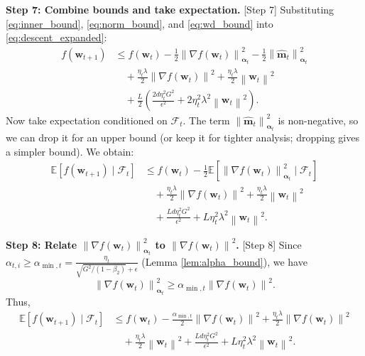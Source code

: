 \documentclass{article}
\theoremstyle{plain}
\theoremstyle{definition}
\renewcommand{\vec}[1]{\boldsymbol{#1}}
\newcommand{\norm}[1]{\left\| #1 \right\|}
\newcommand{\expect}[1]{\mathbb{E}\left[ #1 \right]}
\begin{document}
\textbf{Step 7: Combine bounds and take expectation.} [Step 7]
Substituting \eqref{eq:inner_bound}, \eqref{eq:norm_bound}, and \eqref{eq:wd_bound} into \eqref{eq:descent_expanded}:
\begin{align}
    f(\vec{w}_{t+1}) &\le f(\vec{w}_t) - \frac{1}{2} \norm{\nabla f(\vec{w}_t)}_{\vec{\alpha}_t}^2 - \frac{1}{2} \norm{\hat{\vec{m}}_t}_{\vec{\alpha}_t}^2 \\
    &\quad + \frac{\eta_t \lambda}{2} \norm{\nabla f(\vec{w}_t)}^2 + \frac{\eta_t \lambda}{2} \norm{\vec{w}_t}^2 \\
    &\quad + \frac{L}{2} \left( \frac{2 d \eta_t^2 G^2}{\epsilon^2} + 2 \eta_t^2 \lambda^2 \norm{\vec{w}_t}^2 \right).
\end{align}
Now take expectation conditioned on $\mathcal{F}_t$. The term $\norm{\hat{\vec{m}}_t}_{\vec{\alpha}_t}^2$ is non-negative, so we can drop it for an upper bound (or keep it for tighter analysis; dropping gives a simpler bound). We obtain:
\begin{align}
    \expect{f(\vec{w}_{t+1}) \mid \mathcal{F}_t} &\le f(\vec{w}_t) - \frac{1}{2} \expect{\norm{\nabla f(\vec{w}_t)}_{\vec{\alpha}_t}^2 \mid \mathcal{F}_t} \\
    &\quad + \frac{\eta_t \lambda}{2} \norm{\nabla f(\vec{w}_t)}^2 + \frac{\eta_t \lambda}{2} \norm{\vec{w}_t}^2 \\
    &\quad + \frac{L d \eta_t^2 G^2}{\epsilon^2} + L \eta_t^2 \lambda^2 \norm{\vec{w}_t}^2.
\end{align}

\textbf{Step 8: Relate $\norm{\nabla f(\vec{w}_t)}_{\vec{\alpha}_t}^2$ to $\norm{\nabla f(\vec{w}_t)}^2$.} [Step 8]
Since $\alpha_{t,i} \ge \alpha_{\min,t} = \frac{\eta_t}{\sqrt{G^2/(1-\beta_2)} + \epsilon}$ (Lemma \ref{lem:alpha_bound}), we have
\begin{equation}
    \norm{\nabla f(\vec{w}_t)}_{\vec{\alpha}_t}^2 \ge \alpha_{\min,t} \norm{\nabla f(\vec{w}_t)}^2.
\end{equation}
Thus,
\begin{align}
    \expect{f(\vec{w}_{t+1}) \mid \mathcal{F}_t} &\le f(\vec{w}_t) - \frac{\alpha_{\min,t}}{2} \norm{\nabla f(\vec{w}_t)}^2 + \frac{\eta_t \lambda}{2} \norm{\nabla f(\vec{w}_t)}^2 \\
    &\quad + \frac{\eta_t \lambda}{2} \norm{\vec{w}_t}^2 + \frac{L d \eta_t^2 G^2}{\epsilon^2} + L \eta_t^2 \lambda^2 \norm{\vec{w}_t}^2.
\end{align}
\end{document}
